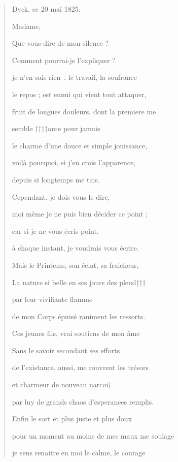\documentclass[a4paper,12pt,twoside]{book}
\begin{document}
			\begin{quotation}
				\begin{flushright}
					Dyck, ce 20 mai 1825.
				\end{flushright}
				
				\begin{center}
					Madame,
				\end{center}
	
				Que vous dire de mon silence ?
				
				Comment pourrai-je l'expliquer ?
				
				je n'en sais rien~: le travail, la soufrance
				
				le repos ; est ennui qui vient tout attaquer,
				
				fruit de longues douleurs, dont la premiere me
				
				semble ††††ante pour jamais
				
				le charme d'une douce et simple jouissance,
				
				voilà pourquoi, si j'en crois l'apparence,
				
				depuis si longtemps me tais.
				
				Cependant, je dois vous le dire,
				
				moi mème je ne puis bien décider ce point ;
				
				car si je ne vous écris point,
				
				à chaque instant, je voudrais vous écrire.
				
				Mais le Printems, son éclat, sa fraicheur,
				
				La nature si belle en ses jours des pleud†††
				
				par leur vivifiante flamme
				
				de mon Corps épuisé raniment les ressorts.
				
				Ces jeunes fils, vrai soutiens de mon âme
				
				Sans le savoir secondant ses efforts
				
				de l'existance, aussi, me rouvrent les trésors
				
				et charmeur de nouveau narcoi†
				
				par luy de grands chaos d'esperances remplis.
				
				Enfin le sort et plus juste et plus doux
				
				pour un moment au moins de mes maux me soulage
				
				je sens renaitre en moi le calme, le courage
				

\end{quotation}
\end{document}
